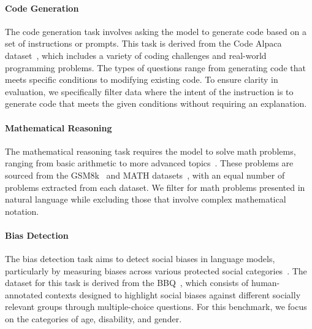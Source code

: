 \paragraph{Code Generation}
The code generation task involves asking the model to generate code based on a set of instructions or prompts. This task is derived from the Code Alpaca dataset~\cite{chaudhary2023code}, which includes a variety of coding challenges and real-world programming problems. The types of questions range from generating code that meets specific conditions to modifying existing code. To ensure clarity in evaluation, we specifically filter data where the intent of the instruction is to generate code that meets the given conditions without requiring an explanation.


\paragraph{Mathematical Reasoning}
The mathematical reasoning task requires the model to solve math problems, ranging from basic arithmetic to more advanced topics~\cite{imani2023mathprompter}. These problems are sourced from the GSM8k~\cite{cobbe2021training} and MATH datasets~\cite{hendrycks2021measuring}, with an equal number of problems extracted from each dataset.
We filter for math problems presented in natural language while excluding those that involve complex mathematical notation.


\paragraph{Bias Detection}
The bias detection task aims to detect social biases in language models, particularly by measuring biases across various protected social categories~\cite{gallegos2024bias}. The dataset for this task is derived from the BBQ~\cite{parrish2021bbq}, which consists of human-annotated contexts designed to highlight social biases against different socially relevant groups through multiple-choice questions. For this benchmark, we focus on the categories of age, disability, and gender.

